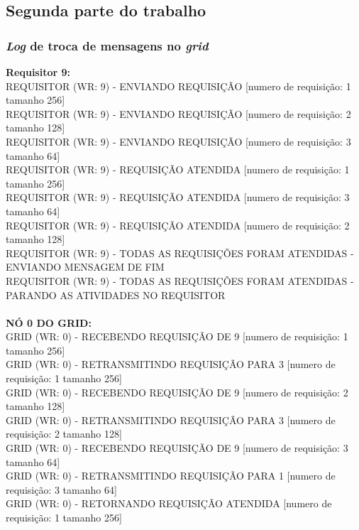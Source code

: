 \documentclass[12pt]{article}
\newcommand\tab[1][1cm]{\hspace*{#1}}
\begin{document}
\subsection{Segunda parte do trabalho}\label{subsec:res2}
\subsubsection{\textit{Log} de troca de mensagens no \textit{grid}}
\tab \textbf{Requisitor 9:}
\\
\tab \tab REQUISITOR (WR: 9) - ENVIANDO REQUISIÇÃO [numero de requisição: 1 tamanho 256]
\\
\tab \tab REQUISITOR (WR: 9) - ENVIANDO REQUISIÇÃO [numero de requisição: 2 tamanho 128]
\\
\tab \tab REQUISITOR (WR: 9) - ENVIANDO REQUISIÇÃO [numero de requisição: 3 tamanho 64]
\\
\tab \tab REQUISITOR (WR: 9) - REQUISIÇÃO ATENDIDA [numero de requisição: 1 tamanho 256]
\\
\tab \tab REQUISITOR (WR: 9) - REQUISIÇÃO ATENDIDA [numero de requisição: 3 tamanho 64]
\\
\tab \tab REQUISITOR (WR: 9) - REQUISIÇÃO ATENDIDA [numero de requisição: 2 tamanho 128]
\\
\tab \tab REQUISITOR (WR: 9) - TODAS AS REQUISIÇÕES FORAM ATENDIDAS - ENVIANDO MENSAGEM DE FIM
\\
\tab \tab REQUISITOR (WR: 9) - TODAS AS REQUISIÇÕES FORAM ATENDIDAS - PARANDO AS ATIVIDADES NO REQUISITOR
\\
\\
\tab \textbf{NÓ 0 DO GRID:}
\\
\tab \tab GRID (WR: 0) - RECEBENDO REQUISIÇÃO DE 9 [numero de requisição: 1 tamanho 256]
\\
\tab \tab GRID (WR: 0) - RETRANSMITINDO REQUISIÇÃO PARA 3 [numero de requisição: 1 tamanho 256]
\\
\tab \tab GRID (WR: 0) - RECEBENDO REQUISIÇÃO DE 9 [numero de requisição: 2 tamanho 128]
\\
\tab \tab GRID (WR: 0) - RETRANSMITINDO REQUISIÇÃO PARA 3 [numero de requisição: 2 tamanho 128]
\\
\tab \tab GRID (WR: 0) - RECEBENDO REQUISIÇÃO DE 9 [numero de requisição: 3 tamanho 64]
\\
\tab \tab GRID (WR: 0) - RETRANSMITINDO REQUISIÇÃO PARA 1 [numero de requisição: 3 tamanho 64]
\\
\tab \tab GRID (WR: 0) - RETORNANDO REQUISIÇÃO ATENDIDA [numero de requisição: 1 tamanho 256]
\end{document}
